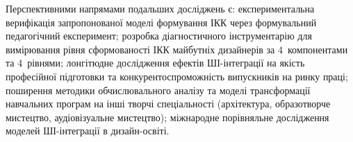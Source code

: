 Перспективними напрямами подальших досліджень є: експериментальна верифікація запропонованої моделі формування ІКК через формувальний педагогічний експеримент; розробка діагностичного інструментарію для вимірювання рівня сформованості ІКК майбутніх дизайнерів за 4~компонентами та 4~рівнями; лонгітюдне дослідження ефектів ШІ-інтеграції на якість професійної підготовки та конкурентоспроможність випускників на ринку праці; поширення методики обчислювального аналізу та моделі трансформації навчальних програм на інші творчі спеціальності (архітектура, образотворче мистецтво, аудіовізуальне мистецтво); міжнародне порівняльне дослідження моделей ШІ-інтеграції в дизайн-освіті.

\label{end_main_text}
